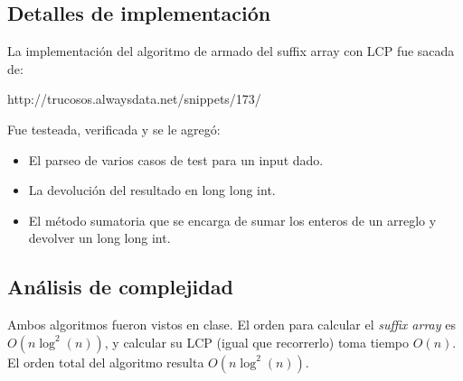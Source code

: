 \subsection*{Detalles de implementación}
La implementación del algoritmo de armado del suffix array con LCP fue sacada de:

http://trucosos.alwaysdata.net/snippets/173/

Fue testeada, verificada y se le agregó:
\begin{itemize}
\item El parseo de varios casos de test para un input dado.
\item La devolución del resultado en long long int.
\item El método sumatoria que se encarga de sumar los enteros de un arreglo y
devolver un long long int.
\end{itemize}

\subsection*{Análisis de complejidad}

Ambos algoritmos fueron vistos en clase. El orden para calcular el {\sl
suffix array} es $O(n\log^2(n))$, y calcular su LCP (igual que recorrerlo)
toma tiempo $O(n)$. El orden total del algoritmo resulta $O(n\log^2(n))$.
